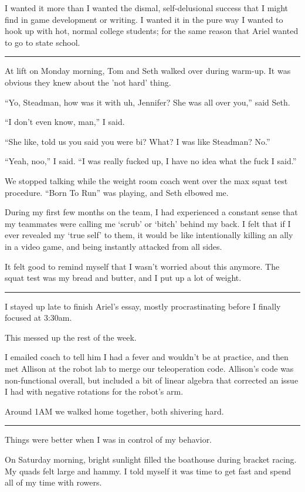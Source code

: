 I wanted it more than I wanted the dismal, self-delusional success that I might
find in game development or writing.  I wanted it in the pure way I wanted to
hook up with hot, normal college students; for the same reason that Ariel
wanted to go to state school. 

\plainfancybreak{12pt}{2}{}

At lift on Monday morning, Tom and Seth walked over during warm-up.  It was
obvious they knew about the 'not hard' thing.  

``Yo, Steadman, how was it with uh, Jennifer?  She was all over you,'' said
Seth.

``I don't even know, man,'' I said.

``She like, told us you said you were bi?  What?  I was like Steadman?
No.''

``Yeah, noo,'' I said. ``I was really fucked up, I have no idea what the fuck I
said.''

We stopped talking while the weight room coach went over the max squat test
procedure.  ``Born To Run'' was playing, and Seth elbowed me.

During my first few months on the team, I had experienced a constant sense that
my teammates were calling me `scrub' or `bitch' behind my back.  I felt that if
I ever revealed my `true self' to them, it would be like intentionally killing
an ally in a video game, and being instantly attacked from all sides.

It felt good to remind myself that I wasn't worried about this anymore.  The
squat test was my bread and butter, and I put up a lot of weight.

\plainfancybreak{12pt}{2}{}

I stayed up late to finish Ariel's essay, mostly procrastinating before I
finally focused at 3:30am.

This messed up the rest of the week.

I emailed coach to tell him I had a fever and wouldn't be at practice, and then
met Allison at the robot lab to merge our teleoperation code.   Allison's code
was non-functional overall, but included a bit of linear algebra that corrected
an issue I had with negative rotations for the robot's arm.

Around 1AM we walked home together, both shivering hard. 

\plainfancybreak{12pt}{2}{}

Things were better when I was in control of my behavior.  

On Saturday morning, bright sunlight filled the boathouse during bracket racing.
My quads felt large and hammy.  I told myself it was time to get fast and spend
all of my time with rowers.

